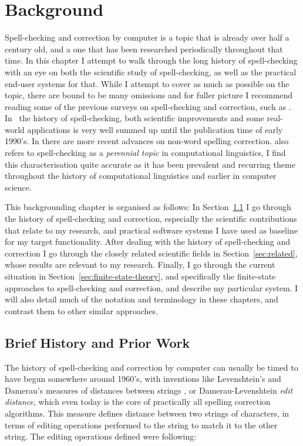 \documentclass[officiallayout]{unihelcompling}
\begin{document}
\chapter{Background}
\label{chap:background}

Spell-checking and correction by computer is a topic that is already over half
a century old, and a one that has been researched periodically throughout that
time.  In this chapter I attempt to walk through the long history of
spell-checking with an eye on both the scientific study of spell-checking, as
well as the practical end-user systems for that. While I attempt to cover as
much as possible on the topic, there are bound to be many omissions and for
fuller picture I recommend reading some of the previous surveys on
spell-checking and correction, such as
\citet{kukich1992spelling,mitton2009ordering}.  In~\citet{kukich1992spelling}
the history of spell-checking, both scientific improvements and some real-world
applications is very well summed up until the publication time of early 1990's.
In \citet{mitton2009ordering} there are more recent advances on non-word
spelling correction.  \citet{kukich1992spelling} also refers to spell-checking
as a \emph{perennial topic} in computational linguistics, I find this
characterisation quite accurate as it has been prevalent and recurring theme
throughout the history of computational linguistics and earlier in computer
science.

This backgrounding chapter is organised as follows: In
Section~\ref{sec:history} I go through the history of spell-checking and
correction, especially the scientific contributions that relate to my research,
and practical software systems I have used as baseline for my target
functionality.  After dealing with the history of spell-checking and correction
I go through the closely related scientific fields in
Section~\ref{sec:related}, whose results are relevant to my research. Finally,
I go through the current situation in Section~\ref{sec:finite-state-theory},
and specifically the finite-state approaches to spell-checking and correction,
and describe my particular system. I will also detail much of the notation and
terminology in these chapters, and contrast them to other similar approaches.

\section{Brief History and Prior Work}
\label{sec:history}

The history of spell-checking and correction by computer can usually be timed
to have begun somewhere around 1960's, with inventions like Levenshtein's and
Damerau's measures of distances between strings
\citep{levenshtein1966binary,damerau1964technique}, or Damerau-Levenshtein
\emph{edit distance}, which even today is the core of practically all spelling
correction algorithms. This measure defines distance between two strings of
characters, in terms of editing operations performed to the string to match it
to the other string. The editing operations defined were following:
\end{document}
